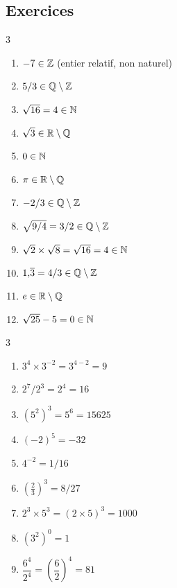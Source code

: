 
\subsection*{Exercices}


\begin{multicols}{3}
\begin{enumerate}
  \item $-7\in\mathbb{Z}$ (entier relatif, non naturel)
  \item $5/3\in\mathbb{Q}\setminus\mathbb{Z}$
  \item $\sqrt{16}=4\in\mathbb{N}$
  \item $\sqrt{3}\in\mathbb{R}\setminus\mathbb{Q}$
  \item $0\in\mathbb{N}$
  \item $\pi\in\mathbb{R}\setminus\mathbb{Q}$
  \item $-2/3\in\mathbb{Q}\setminus\mathbb{Z}$
  \item $\sqrt{9/4}=3/2\in\mathbb{Q}\setminus\mathbb{Z}$
  \item $\sqrt{2}\times\sqrt{8}=\sqrt{16}=4\in\mathbb{N}$
  \item $1{,}\overline{3}=4/3\in\mathbb{Q}\setminus\mathbb{Z}$
  \item $e\in\mathbb{R}\setminus\mathbb{Q}$
  \item $\sqrt{25}-5=0\in\mathbb{N}$
\end{enumerate}
\end{multicols}


\begin{multicols}{3}
\begin{enumerate}
  \item $3^4\times3^{-2}=3^{4-2}=9$
  \item $2^7/2^3=2^4=16$
  \item $(5^2)^3=5^6=15625$
  \item $(-2)^5=-32$
  \item $4^{-2}=1/16$
  \item $\left(\tfrac{2}{3}\right)^3=8/27$
  \item $2^3\times5^3=(2\times5)^3=1000$
  \item $(3^2)^0=1$
  \item $\dfrac{6^4}{2^4}=\left(\dfrac{6}{2}\right)^4=81$
\end{enumerate}
\end{multicols}

